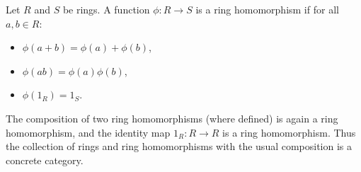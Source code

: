 Let $R$ and $S$ be rings. A function $\phi: R \to S$ is a ring homomorphism if for all $a, b \in R$:
\begin{itemize}
\item $\phi(a + b) = \phi(a) + \phi(b)$,
\item $\phi(ab) = \phi(a)\phi(b)$,
\item $\phi(1_R) = 1_S$.
\end{itemize}
The composition of two ring homomorphisms (where defined) is again a ring homomorphism, and the identity map $1_R: R \to R$ is a ring homomorphism. Thus the collection of rings and ring homomorphisms with the usual composition is a concrete category.
